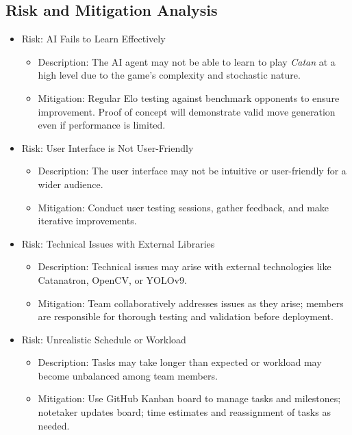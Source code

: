 \documentclass{article}
\begin{document}
\subsection{Risk and Mitigation Analysis}\label{subsec:risk}
\begin{itemize}
    \item {Risk: AI Fails to Learn Effectively}
    \begin{itemize}
        \item Description: The AI agent may not be able to learn to play \emph{Catan} at a high level due to the game's complexity and stochastic nature.
        \item Mitigation: Regular Elo testing against benchmark opponents to ensure improvement. Proof of concept will demonstrate valid move generation even if performance is limited.
    \end{itemize}

    \item {Risk: User Interface is Not User-Friendly}
    \begin{itemize}
        \item Description: The user interface may not be intuitive or user-friendly for a wider audience.
        \item Mitigation: Conduct user testing sessions, gather feedback, and make iterative improvements.
    \end{itemize}

    \item {Risk: Technical Issues with External Libraries}
    \begin{itemize}
        \item Description: Technical issues may arise with external technologies like Catanatron, OpenCV, or YOLOv9.
        \item Mitigation: Team collaboratively addresses issues as they arise; members are responsible for thorough testing and validation before deployment.
    \end{itemize}

    \item {Risk: Unrealistic Schedule or Workload}
    \begin{itemize}
        \item Description: Tasks may take longer than expected or workload may become unbalanced among team members.
        \item Mitigation: Use GitHub Kanban board to manage tasks and milestones; notetaker updates board; time estimates and reassignment of tasks as needed.
    \end{itemize}
\end{itemize}
\end{document}

